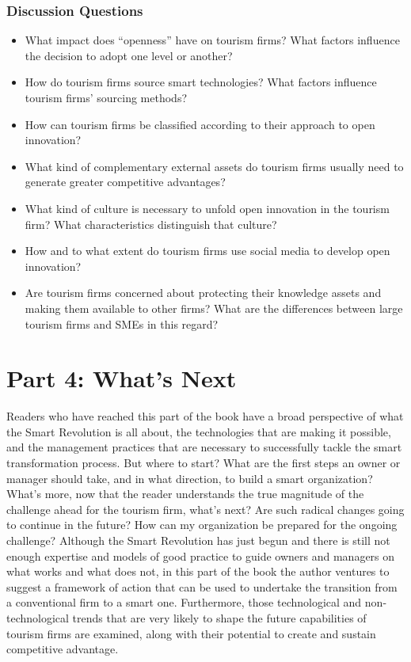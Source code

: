 \documentclass[
  letterpaper,
  DIV=11,
  numbers=noendperiod]{scrreprt}
\begin{document}
\hypertarget{discussion-questions-16}{%
\section{Discussion Questions}\label{discussion-questions-16}}

\begin{itemize}
\item
  What impact does ``openness'' have on tourism firms? What factors
  influence the decision to adopt one level or another?
\item
  How do tourism firms source smart technologies? What factors influence
  tourism firms' sourcing methods?
\item
  How can tourism firms be classified according to their approach to
  open innovation?
\item
  What kind of complementary external assets do tourism firms usually
  need to generate greater competitive advantages?
\item
  What kind of culture is necessary to unfold open innovation in the
  tourism firm? What characteristics distinguish that culture?
\item
  How and to what extent do tourism firms use social media to develop
  open innovation?
\item
  Are tourism firms concerned about protecting their knowledge assets
  and making them available to other firms? What are the differences
  between large tourism firms and SMEs in this regard?
\end{itemize}

\part{Part 4: What's Next}

Readers who have reached this part of the book have a broad perspective
of what the Smart Revolution is all about, the technologies that are
making it possible, and the management practices that are necessary to
successfully tackle the smart transformation process. But where to
start? What are the first steps an owner or manager should take, and in
what direction, to build a smart organization? What's more, now that the
reader understands the true magnitude of the challenge ahead for the
tourism firm, what's next? Are such radical changes going to continue in
the future? How can my organization be prepared for the ongoing
challenge? Although the Smart Revolution has just begun and there is
still not enough expertise and models of good practice to guide owners
and managers on what works and what does not, in this part of the book
the author ventures to suggest a framework of action that can be used to
undertake the transition from a conventional firm to a smart one.
Furthermore, those technological and non-technological trends that are
very likely to shape the future capabilities of tourism firms are
examined, along with their potential to create and sustain competitive
advantage.
\end{document}
